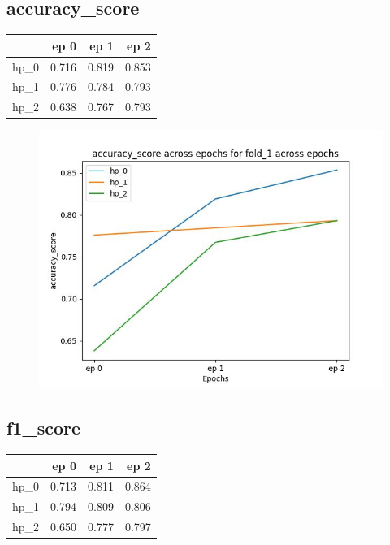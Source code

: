 \documentclass{article}
\begin{document}
\subsection{accuracy\_score}
\begin{tabular}{lrrr}
\toprule
{} &   ep 0 &   ep 1 &   ep 2 \\
\midrule
hp\_0 &  0.716 &  0.819 &  0.853 \\
hp\_1 &  0.776 &  0.784 &  0.793 \\
hp\_2 &  0.638 &  0.767 &  0.793 \\
\bottomrule
\end{tabular}

\begin{figure}[H]
\includegraphics[scale = 0.75]{fold_1/accuracy_score}
\end{figure}
\subsection{f1\_score}
\begin{tabular}{lrrr}
\toprule
{} &   ep 0 &   ep 1 &   ep 2 \\
\midrule
hp\_0 &  0.713 &  0.811 &  0.864 \\
hp\_1 &  0.794 &  0.809 &  0.806 \\
hp\_2 &  0.650 &  0.777 &  0.797 \\
\bottomrule
\end{tabular}
\end{document}
